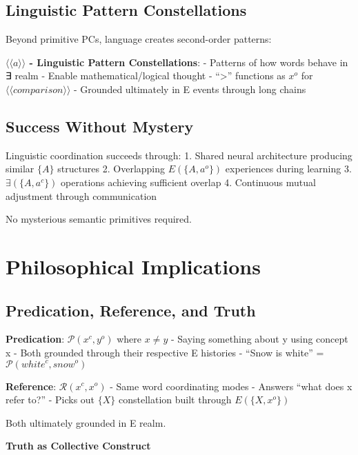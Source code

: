 \documentclass[12pt]{article}
\begin{document}
\subsection{Linguistic Pattern Constellations}\label{linguistic-pattern-constellations}

Beyond primitive PCs, language creates second-order patterns:

\textbf{\(\langle\langle a \rangle\rangle\) - Linguistic Pattern Constellations}: - Patterns of how words behave in ∃ realm - Enable mathematical/logical thought - ``\textgreater{}'' functions as \(x^o\) for \(\langle\langle comparison \rangle\rangle\) - Grounded ultimately in E events through long chains

\subsection{Success Without Mystery}\label{success-without-mystery}

Linguistic coordination succeeds through: 1. Shared neural architecture producing similar \(\{A\}\) structures 2. Overlapping \(E(\{A, a^o\})\) experiences during learning 3. \(\exists(\{A, a^c\})\) operations achieving sufficient overlap 4. Continuous mutual adjustment through communication

No mysterious semantic primitives required.

\section{Philosophical Implications}\label{philosophical-implications}

\subsection{Predication, Reference, and Truth}\label{predication-reference-and-truth}

\textbf{Predication}: \(\mathcal{P}(x^c, y^o)\) where \(x \neq y\) - Saying something about y using concept x - Both grounded through their respective E histories - ``Snow is white'' = \(\mathcal{P}(white^c, snow^o)\)

\textbf{Reference}: \(\mathcal{R}(x^c, x^o)\) - Same word coordinating modes - Answers ``what does x refer to?'' - Picks out \(\{X\}\) constellation built through \(E(\{X, x^o\})\)

Both ultimately grounded in E realm.

\textbf{Truth as Collective Construct}
\end{document}
